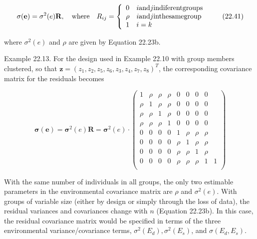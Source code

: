 \documentclass{article}
\begin{document}
\begin{equation}
\sigma(\mathbf{e})=\sigma^{2}(e)\mathbf{R},\quad\mathrm{w h e r e}\quad R_{i j}=\left\{\begin{array}{l l}0&i\mathrm{a n d}j\mathrm{i n d i f e r e n t g r o u p s}\\ \rho&i\mathrm{a n d}j\mathrm{i n t h e s a m e g r o u p}\\ 1&i=k\end{array}\right.
\tag{22.41}
\label{eq:22_41}
\end{equation}

where  $ \sigma^{2}(e) $ and  $ \rho $ are given by Equation 22.23b.

Example 22.13. For the design used in Example 22.10 with group members clustered, so that  $ \mathbf{z} = (z_1, z_2, z_5, z_6, z_3, z_4, z_7, z_8)^T $, the corresponding covariance matrix for the residuals becomes

\begin{equation}
\boldsymbol{\sigma}(\mathbf{e})=\boldsymbol{\sigma}^{2}(e)\mathbf{R}=\boldsymbol{\sigma}^{2}(e)\cdot\begin{pmatrix}{{{1}}}&{{{\rho}}}&{{{\rho}}}&{{{\rho}}}&{{{0}}}&{{{0}}}&{{{0}}}&{{{0}}} \\{{{\rho}}}&{{{1}}}&{{{\rho}}}&{{{\rho}}}&{{{0}}}&{{{0}}}&{{{0}}}&{{{0}}} \\{{{\rho}}}&{{{\rho}}}&{{{1}}}&{{{\rho}}}&{{{0}}}&{{{0}}}&{{{0}}}&{{{0}}} \\{{{\rho}}}&{{{\rho}}}&{{{\rho}}}&{{{1}}}&{{{0}}}&{{{0}}}&{{{0}}}&{{{0}}} \\{{{0}}}&{{{0}}}&{{{0}}}&{{{0}}}&{{{1}}}&{{{\rho}}}&{{{\rho}}}&{{{\rho}}} \\{{{0}}}&{{{0}}}&{{{0}}}&{{{0}}}&{{{\rho}}}&{{{1}}}&{{{\rho}}}&{{{\rho}}} \\{{{0}}}&{{{0}}}&{{{0}}}&{{{0}}}&{{{\rho}}}&{{{\rho}}}&{{{1}}}&{{{\rho}}} \\{{{0}}}&{{{0}}}&{{{0}}}&{{{0}}}&{{{\rho}}}&{{{\rho}}}&{{{\rho}}}&{{{1}}}&{{{1}}} \\\end{pmatrix}
\end{equation}

With the same number of individuals in all groups, the only two estimable parameters in the environmental covariance matrix are  $ \rho $ and  $ \sigma^2(e) $. With groups of variable size (either by design or simply through the loss of data), the residual variances and covariances change with  $ n $ (Equation 22.23b). In this case, the residual covariance matrix would be specified in terms of the three environmental variance/covariance terms,  $ \sigma^2(E_d), \sigma^2(E_s) $, and  $ \sigma(E_d, E_s) $.
\end{document}
